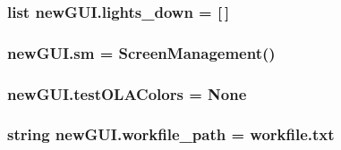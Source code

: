 \subsubsection[{\texorpdfstring{lights\+\_\+down}{lights_down}}]{\setlength{\rightskip}{0pt plus 5cm}list new\+G\+U\+I.\+lights\+\_\+down = \mbox{[}$\,$\mbox{]}}\hypertarget{namespacenewGUI_a2d3315806a79ccd081272c11632e8287}{}\label{namespacenewGUI_a2d3315806a79ccd081272c11632e8287}
\subsubsection[{\texorpdfstring{sm}{sm}}]{\setlength{\rightskip}{0pt plus 5cm}new\+G\+U\+I.\+sm = {\bf Screen\+Management}()}\hypertarget{namespacenewGUI_aead1b4e98dbd3c8dadf69c1e77f1f15a}{}\label{namespacenewGUI_aead1b4e98dbd3c8dadf69c1e77f1f15a}
\subsubsection[{\texorpdfstring{test\+O\+L\+A\+Colors}{testOLAColors}}]{\setlength{\rightskip}{0pt plus 5cm}new\+G\+U\+I.\+test\+O\+L\+A\+Colors = None}\hypertarget{namespacenewGUI_a848be0fa44db58426e494eeac159d0be}{}\label{namespacenewGUI_a848be0fa44db58426e494eeac159d0be}
\subsubsection[{\texorpdfstring{workfile\+\_\+path}{workfile_path}}]{\setlength{\rightskip}{0pt plus 5cm}string new\+G\+U\+I.\+workfile\+\_\+path = \textquotesingle{}workfile.\+txt\textquotesingle{}}\hypertarget{namespacenewGUI_aa6053557debf9b425afe60392b0a7ecb}{}\label{namespacenewGUI_aa6053557debf9b425afe60392b0a7ecb}
